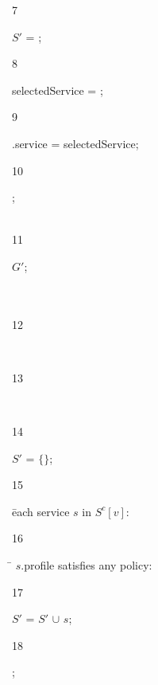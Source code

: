 \begin{figure}[!t]
\begin{ourcolor}
\begin{tabbing}
      \begin{redtext}7\end{redtext}\tabone $S'$ = ;\\
      \begin{redtext}8\end{redtext}\tabone selectedService = ;\\
      \begin{redtext}9\end{redtext}\tabone \vii{}.service = selectedService;\\
      \begin{redtext}10\end{redtext};\\
      \\
      \begin{redtext}11\end{redtext} $G'$;\\
      \\
      \\
      \begin{redtext}12\end{redtext}\\
      \begin{redtext}13\end{redtext}\\
      \begin{redtext}14\end{redtext}$S'$ = $\{\}$;\\
      \begin{redtext}15\end{redtext} \= each service $s$ in $S^c[v]$:\\
      \begin{redtext}16\end{redtext}\tabone {} \= $s$.profile satisfies any policy:\\
      \begin{redtext}17\end{redtext}\tabtwo $S'$ = $S'$ $\cup$ $s$;\\
      \begin{redtext}18\end{redtext}\tabone{};\\

\end{tabbing}
\end{ourcolor}
\end{figure}
